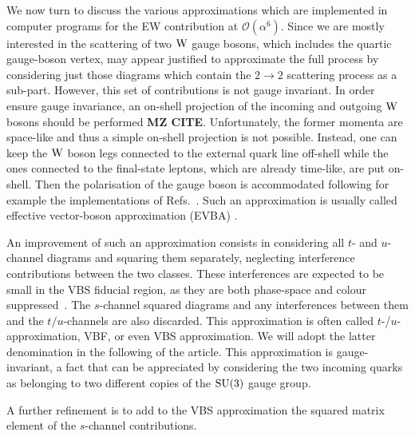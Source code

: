We now turn to discuss the various approximations which are implemented in computer programs for the EW contribution at
$\mathcal{O}{\left(\alpha^{6}\right)}$. Since we are mostly interested in 
the scattering of two $\text{W}$ gauge bosons, which includes the quartic gauge-boson vertex, may appear justified to approximate the 
full process by considering just those diagrams which contain the $2\rightarrow 2$ scattering process as a sub-part.
However, this set of contributions is not gauge invariant.
In order ensure gauge invariance, an on-shell projection of the incoming and outgoing $\text{W}$ bosons should be performed {\bf MZ CITE}.
Unfortunately, the former momenta are space-like and thus a simple on-shell projection is not possible.
Instead, one can keep the $\text{W}$ boson legs connected to the external quark line off-shell while the ones connected 
to the final-state leptons, which are already time-like, are put on-shell. 
Then the polarisation of the gauge boson is accommodated following for example the implementations of Refs.~\cite{Kuss:1995yv,Accomando:2006hq}.
Such an approximation is usually called effective vector-boson approximation (EVBA) \cite{Dawson:1984gx,Duncan:1985vj,Cahn:1983ip}.

An improvement of such an approximation consists 
in considering all $t$- and $u$-channel diagrams and squaring them separately, neglecting interference contributions between the two classes.
These interferences are expected to be small in the VBS fiducial region, as they are both phase-space and colour suppressed~\cite{Oleari:2003tc,Denner:2012dz}.
The $s$-channel squared diagrams and any interferences between them and the  $t/u$-channels are also discarded.
This approximation is often called $t$-/$u$- approximation, VBF, or even VBS approximation.
We will adopt the latter denomination in the following of the article.
This approximation is gauge-invariant, a fact that can be appreciated by considering the two incoming quarks as belonging to two different copies of the $\rm{SU}(3)$ gauge group.

A further refinement is to add to the VBS approximation the squared matrix element of the $s$-channel contributions.


